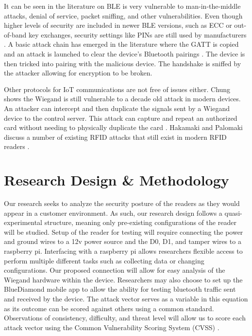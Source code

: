 \documentclass[10pt,twocolumn,letterpaper]{article}
\begin{document}
It can be seen in the literature on BLE is very vulnerable to man-in-the-middle attacks, denial of service, packet sniffing, and other vulnerabilities. Even though higher levels of security are included in newer BLE versions, such as ECC or out-of-band key exchanges, security settings like PINs are still used by manufacturers \cite{8622000}\cite{jaihc19}\cite{mryan13}. A basic attack chain has emerged in the literature where the GATT is copied and an attack is launched to clear the device's Bluetooth pairings \cite{jaihc19}. The device is then tricked into pairing with the malicious device. The handshake is sniffed by the attacker allowing for encryption to be broken.

Other protocols for IoT communications are not free of issues either. Chung shows the Wiegand is still vulnerable to a decade old attack in modern devices. An attacker can intercept and then duplicate the signals sent by a Wiegand device to the control server. This attack can capture and repeat an authorized card without needing to physically duplicate the card \cite{chung2017wiegand}. Hakamaki and Palomaki discuss a number of existing RFID attacks that still exist in modern RFID readers \cite{rfid15}.

\section{Research Design \& Methodology}
Our research seeks to analyze the security posture of the readers as they would appear in a customer environment. As such, our research design follows a quasi-experimental structure, meaning only pre-existing configurations of the reader will be studied. Setup of the reader for testing will require connecting the power and ground wires to a 12v power source and the D0, D1, and tamper wires to a raspberry pi. Interfacing with a raspberry pi allows researchers flexible access to perform multiple different tasks such as collecting data or changing configurations. Our proposed connection will allow for easy analysis of the Wiegand hardware within the device. Researchers may also choose to set up the BlueDiamond mobile app to allow the ability for testing bluetooth traffic sent and received by the device. The attack vector serves as a variable in this equation as its outcome can be scored against others using a common standard. Observations of consistency, difficulty, and threat level will allow us to score each attack vector using the Common Vulnerability Scoring System (CVSS) \cite{cvss}.
\end{document}
